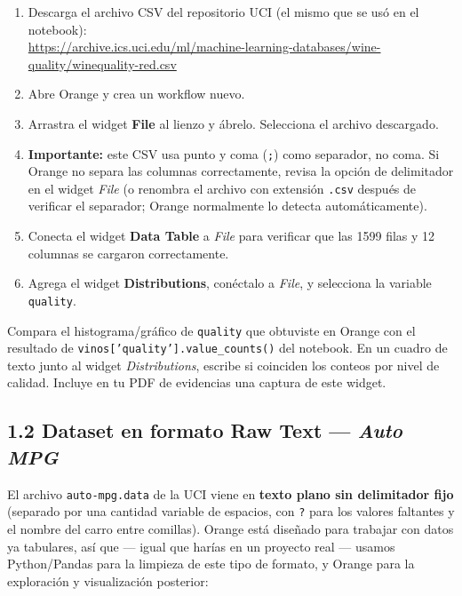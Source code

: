 \documentclass[11pt,letterpaper]{article}
\begin{document}
\begin{enumerate}[leftmargin=1.2cm]
  \item Descarga el archivo CSV del repositorio UCI (el mismo que se usó en el notebook):\\
  \url{https://archive.ics.uci.edu/ml/machine-learning-databases/wine-quality/winequality-red.csv}
  \item Abre Orange y crea un workflow nuevo.
  \item Arrastra el widget \textbf{File} al lienzo y ábrelo. Selecciona el archivo descargado.
  \item \textbf{Importante:} este CSV usa punto y coma (\texttt{;}) como separador, no coma. Si Orange no separa las columnas correctamente, revisa la opción de delimitador en el widget \textit{File} (o renombra el archivo con extensión \texttt{.csv} después de verificar el separador; Orange normalmente lo detecta automáticamente).
  \item Conecta el widget \textbf{Data Table} a \textit{File} para verificar que las 1599 filas y 12 columnas se cargaron correctamente.
  \item Agrega el widget \textbf{Distributions}, conéctalo a \textit{File}, y selecciona la variable \texttt{quality}.
\end{enumerate}

\begin{actividad}
Compara el histograma/gráfico de \texttt{quality} que obtuviste en Orange con el resultado de \texttt{vinos['quality'].value\_counts()} del notebook. En un cuadro de texto junto al widget \textit{Distributions}, escribe si coinciden los conteos por nivel de calidad. Incluye en tu PDF de evidencias una captura de este widget.
\end{actividad}

\subsection{1.2 Dataset en formato Raw Text --- \textit{Auto MPG}}

El archivo \texttt{auto-mpg.data} de la UCI viene en \textbf{texto plano sin delimitador fijo} (separado por una cantidad variable de espacios, con \texttt{?} para los valores faltantes y el nombre del carro entre comillas). Orange está diseñado para trabajar con datos ya tabulares, así que --- igual que harías en un proyecto real --- usamos Python/Pandas para la limpieza de este tipo de formato, y Orange para la exploración y visualización posterior:
\end{document}

